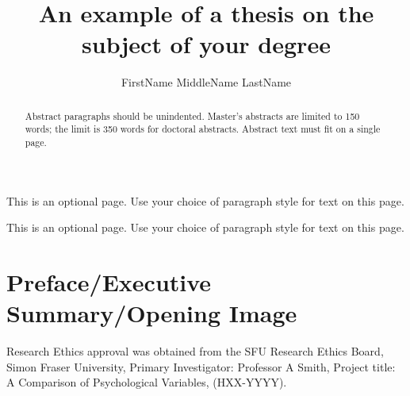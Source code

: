 \documentclass{sfuthesis}
\title{An example of a thesis on the subject of your degree}
\author{FirstName MiddleName LastName}
\begin{document}
\frontmatter
\maketitle{}
\makecommittee{}


\begin{abstract}
Abstract paragraphs should be unindented. Master's abstracts are limited to 150 words; the limit is 350 words for doctoral abstracts. Abstract text must fit on a single page.
\end{abstract}


\begin{dedication}
This is an optional page. Use your choice of paragraph style for text on this page.
\end{dedication}


\begin{acknowledgements}
This is an optional page. Use your choice of paragraph style for text on this page.
\end{acknowledgements}

%
\tableofcontents%
\clearpage

%
\listoftables%
\clearpage

%
\listoffigures%
\clearpage


	



\chapter{Preface/Executive Summary/Opening Image}
Research Ethics approval was obtained from the SFU Research Ethics Board, Simon Fraser University, Primary Investigator: Professor A Smith, Project title: A Comparison of Psychological Variables, (HXX-YYYY).
\clearpage
\end{document}
